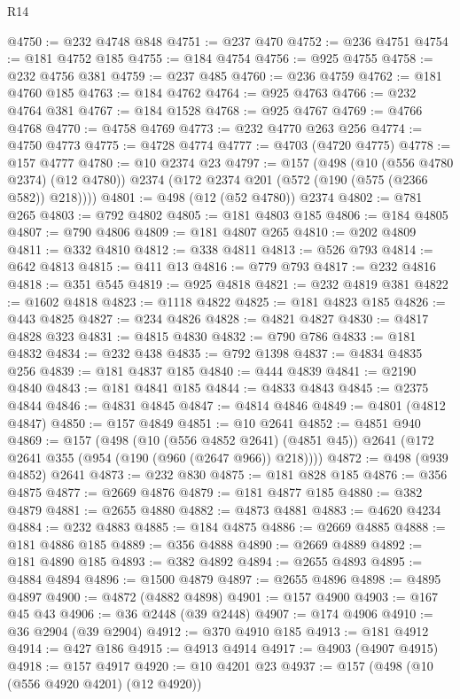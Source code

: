 \begin{lexlean}{R14}
\begin{coremodule}
@4750 := @232 @4748 @848
@4751 := @237 @470
@4752 := @236 @4751
@4754 := @181 @4752 @185
@4755 := @184 @4754
@4756 := @925 @4755
@4758 := @232 @4756 @381
@4759 := @237 @485
@4760 := @236 @4759
@4762 := @181 @4760 @185
@4763 := @184 @4762
@4764 := @925 @4763
@4766 := @232 @4764 @381
@4767 := @184 @1528
@4768 := @925 @4767
@4769 := @4766 @4768
@4770 := @4758 @4769
@4773 := @232 @4770 @263 @256
@4774 := @4750 @4773
@4775 := @4728 @4774
@4777 := @4703 (@4720 @4775)
@4778 := @157 @4777
@4780 := @10 @2374 @23
@4797 := @157
    (@498
      (@10 (@556 @4780 @2374) (@12 @4780))
      @2374
      (@172 @2374 @201 (@572 (@190 (@575 (@2366 @582)) @218))))
@4801 := @498 (@12 (@52 @4780)) @2374
@4802 := @781 @265
@4803 := @792 @4802
@4805 := @181 @4803 @185
@4806 := @184 @4805
@4807 := @790 @4806
@4809 := @181 @4807 @265
@4810 := @202 @4809
@4811 := @332 @4810
@4812 := @338 @4811
@4813 := @526 @793
@4814 := @642 @4813
@4815 := @411 @13
@4816 := @779 @793
@4817 := @232 @4816
@4818 := @351 @545
@4819 := @925 @4818
@4821 := @232 @4819 @381
@4822 := @1602 @4818
@4823 := @1118 @4822
@4825 := @181 @4823 @185
@4826 := @443 @4825
@4827 := @234 @4826
@4828 := @4821 @4827
@4830 := @4817 @4828 @323
@4831 := @4815 @4830
@4832 := @790 @786
@4833 := @181 @4832
@4834 := @232 @438
@4835 := @792 @1398
@4837 := @4834 @4835 @256
@4839 := @181 @4837 @185
@4840 := @444 @4839
@4841 := @2190 @4840
@4843 := @181 @4841 @185
@4844 := @4833 @4843
@4845 := @2375 @4844
@4846 := @4831 @4845
@4847 := @4814 @4846
@4849 := @4801 (@4812 @4847)
@4850 := @157 @4849
@4851 := @10 @2641
@4852 := @4851 @940
@4869 := @157
    (@498
      (@10 (@556 @4852 @2641) (@4851 @45))
      @2641
      (@172 @2641 @355 (@954 (@190 (@960 (@2647 @966)) @218))))
@4872 := @498 (@939 @4852) @2641
@4873 := @232 @830
@4875 := @181 @828 @185
@4876 := @356 @4875
@4877 := @2669 @4876
@4879 := @181 @4877 @185
@4880 := @382 @4879
@4881 := @2655 @4880
@4882 := @4873 @4881
@4883 := @4620 @4234
@4884 := @232 @4883
@4885 := @184 @4875
@4886 := @2669 @4885
@4888 := @181 @4886 @185
@4889 := @356 @4888
@4890 := @2669 @4889
@4892 := @181 @4890 @185
@4893 := @382 @4892
@4894 := @2655 @4893
@4895 := @4884 @4894
@4896 := @1500 @4879
@4897 := @2655 @4896
@4898 := @4895 @4897
@4900 := @4872 (@4882 @4898)
@4901 := @157 @4900
@4903 := @167 @45 @43
@4906 := @36 @2448 (@39 @2448)
@4907 := @174 @4906
@4910 := @36 @2904 (@39 @2904)
@4912 := @370 @4910 @185
@4913 := @181 @4912
@4914 := @427 @186
@4915 := @4913 @4914
@4917 := @4903 (@4907 @4915)
@4918 := @157 @4917
@4920 := @10 @4201 @23
@4937 := @157
    (@498
      (@10 (@556 @4920 @4201) (@12 @4920))

\end{coremodule}
\end{lexlean}
